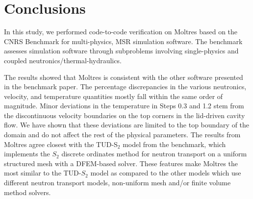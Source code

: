 \section{Conclusions}

In this study, we performed code-to-code verification on Moltres based on the
CNRS Benchmark \citep{tiberga_results_2020} for multi-physics,
\gls{MSR} simulation software. The benchmark assesses simulation
software through subproblems involving single-physics and coupled
neutronics/thermal-hydraulics.

The results showed that Moltres is consistent with the other software
presented in the benchmark paper. The percentage discrepancies in the various
neutronics, velocity, and temperature quantities mostly fall within the same
order of magnitude. Minor deviations in the temperature in Steps 0.3 and 1.2 
stem from the discontinuous velocity
boundaries on the top corners in the lid-driven cavity flow. We have shown that
these deviations are limited to the top boundary of the domain and do not
affect the rest of the physical parameters. The results from
Moltres agree closest with the TUD-S$_2$ model
from the benchmark, which implements the $S_2$ discrete ordinates method for
neutron transport on a uniform structured mesh with a \gls{DFEM}-based solver.
These features make Moltres the most similar to the TUD-$S_2$ model as compared
to the other models which use different neutron transport models, non-uniform
mesh and/or finite volume method solvers.
